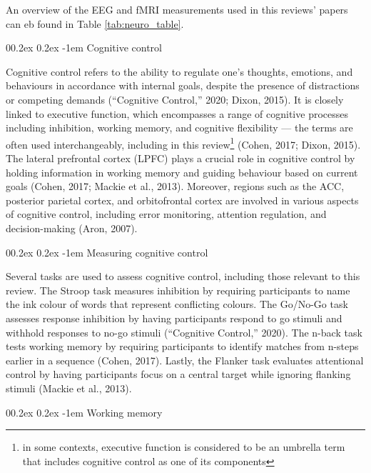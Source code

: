 \documentclass[
  stu, a4paper,floatsintext]{apa7}
\makeatletter
\let\oldparagraph\paragraph
\renewcommand{\paragraph}[1]{\oldparagraph{#1}\mbox{}}
\renewcommand{\paragraph}{\@startsection{paragraph}{4}{\parindent}%
  {0\baselineskip \@plus 0.2ex \@minus 0.2ex}%
  {-1em}%
  {\normalfont\normalsize\bfseries\itshape\typesectitle}}
\renewcommand{\paragraph}{\@startsection{paragraph}{4}{\parindent}%
  {0\baselineskip \@plus 0.2ex \@minus 0.2ex}%
  {-1em}%
  {\normalfont\normalsize\bfseries\typesectitle}}
\makeatother
\begin{document}
An overview of the EEG and fMRI measurements used in this reviews' papers can eb found in Table \ref{tab:neuro_table}.

\paragraph{Cognitive control}\label{cognitive-control}

Cognitive control refers to the ability to regulate one's thoughts, emotions, and behaviours in accordance with internal goals, despite the presence of distractions or competing demands ({``Cognitive Control,''} 2020; Dixon, 2015).
It is closely linked to executive function, which encompasses a range of cognitive processes including inhibition, working memory, and cognitive flexibility --- the terms are often used interchangeably, including in this review\footnote{in some contexts, executive function is considered to be an umbrella term that includes cognitive control as one of its components} (Cohen, 2017; Dixon, 2015).
The lateral prefrontal cortex (LPFC) plays a crucial role in cognitive control by holding information in working memory and guiding behaviour based on current goals (Cohen, 2017; Mackie et al., 2013).
Moreover, regions such as the ACC, posterior parietal cortex, and orbitofrontal cortex are involved in various aspects of cognitive control, including error monitoring, attention regulation, and decision-making (Aron, 2007).

\paragraph{Measuring cognitive control}\label{measuring-cognitive-control}

Several tasks are used to assess cognitive control, including those relevant to this review.
The Stroop task measures inhibition by requiring participants to name the ink colour of words that represent conflicting colours.
The Go/No-Go task assesses response inhibition by having participants respond to go stimuli and withhold responses to no-go stimuli ({``Cognitive Control,''} 2020).
The n-back task tests working memory by requiring participants to identify matches from n-steps earlier in a sequence (Cohen, 2017).
Lastly, the Flanker task evaluates attentional control by having participants focus on a central target while ignoring flanking stimuli (Mackie et al., 2013).

\paragraph{Working memory}\label{working-memory}
\end{document}
